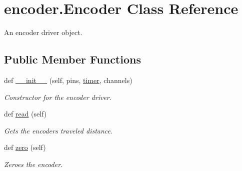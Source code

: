 \hypertarget{classencoder_1_1_encoder}{}\section{encoder.\+Encoder Class Reference}
\label{classencoder_1_1_encoder}


An encoder driver object.  


\subsection*{Public Member Functions}
\begin{DoxyCompactItemize}
\item 
def \mbox{\hyperlink{classencoder_1_1_encoder_a34939827412badc93f8744540676e833}{\+\_\+\+\_\+init\+\_\+\+\_\+}} (self, pins, \mbox{\hyperlink{classencoder_1_1_encoder_a8e9c3e1317abc4f6fbe95468c69223d1}{timer}}, channels)
\begin{DoxyCompactList}\small\item\em Constructor for the encoder driver. \end{DoxyCompactList}\item 
def \mbox{\hyperlink{classencoder_1_1_encoder_aa1c1535160682500f5214f45d8197027}{read}} (self)
\begin{DoxyCompactList}\small\item\em Gets the encoder\textquotesingle{}s traveled distance. \end{DoxyCompactList}\item 
def \mbox{\hyperlink{classencoder_1_1_encoder_ae238ecdbcbce8a193c2e0ffbb4d1dd29}{zero}} (self)
\begin{DoxyCompactList}\small\item\em Zeroes the encoder. \end{DoxyCompactList}\end{DoxyCompactItemize}
